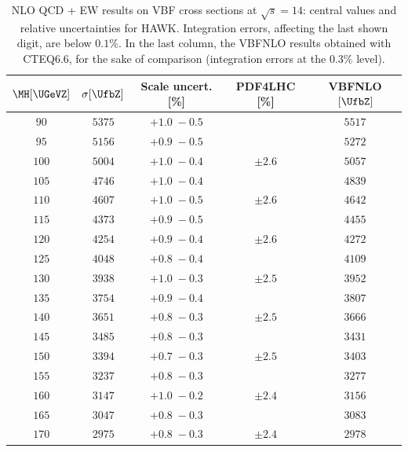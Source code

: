 \begin{table}
  \caption{NLO QCD + EW results on VBF cross sections at $\sqrt{s} = 14$\UTeV: central values  and relative uncertainties  for {\sc HAWK}. Integration errors,
  affecting the last shown digit, are below $0.1\%$. In the last column, the
  {\sc VBFNLO} results obtained with CTEQ6.6, for the sake of comparison
  (integration errors at the $0.3\%$ level).}
  \label{tab:siEWnoSch14TeV}
  \centering
  \small
  \begin{tabular}{ccccc}\hline
$\MH [\UGeVZ]$ & $\sigma[\UfbZ]$ & Scale uncert. [\%] & PDF4LHC [\%] & {\sc VBFNLO} $[\UfbZ]$\\
  \hline
$90  $&$ 5375  $&$ +1.0 \; -\!0.5 $&$          $&$ 5517  $ \\
$95  $&$ 5156  $&$ +0.9 \; -\!0.5 $&$          $&$ 5272  $ \\
$100 $&$ 5004  $&$ +1.0 \; -\!0.4 $&$ \pm 2.6  $&$ 5057  $ \\
$105 $&$ 4746  $&$ +1.0 \; -\!0.4 $&$          $&$ 4839  $ \\
$110 $&$ 4607  $&$ +1.0 \; -\!0.5 $&$ \pm 2.6  $&$ 4642  $ \\
$115 $&$ 4373  $&$ +0.9 \; -\!0.5 $&$          $&$ 4455  $ \\
$120 $&$ 4254  $&$ +0.9 \; -\!0.4 $&$ \pm 2.6  $&$ 4272  $ \\
$125 $&$ 4048  $&$ +0.8 \; -\!0.4 $&$          $&$ 4109  $ \\
$130 $&$ 3938  $&$ +1.0 \; -\!0.3 $&$ \pm 2.5  $&$ 3952  $ \\
$135 $&$ 3754  $&$ +0.9 \; -\!0.4 $&$          $&$ 3807  $ \\
$140 $&$ 3651  $&$ +0.8 \; -\!0.3 $&$ \pm 2.5  $&$ 3666  $ \\
$145 $&$ 3485  $&$ +0.8 \; -\!0.3 $&$          $&$ 3431  $ \\
$150 $&$ 3394  $&$ +0.7 \; -\!0.3 $&$ \pm 2.5  $&$ 3403  $ \\
$155 $&$ 3237  $&$ +0.8 \; -\!0.3 $&$          $&$ 3277  $ \\
$160 $&$ 3147  $&$ +1.0 \; -\!0.2 $&$ \pm 2.4  $&$ 3156  $ \\
$165 $&$ 3047  $&$ +0.8 \; -\!0.3 $&$          $&$ 3083  $ \\
$170 $&$ 2975  $&$ +0.8 \; -\!0.3 $&$ \pm 2.4  $&$ 2978  $ \\

\end{tabular}
\end{table}
